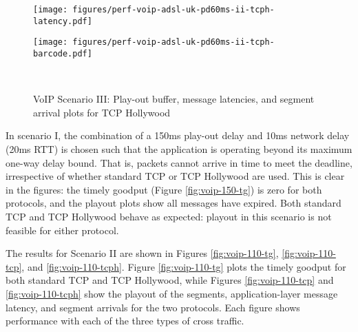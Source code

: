 \begin{figure*}[t!]
{{\begin{minipage}{61mm}
\texttt{[image: figures/perf-voip-adsl-uk-pd60ms-ii-tcph-latency.pdf]}\vspace{1mm}
\end{minipage}
\begin{minipage}{61mm}
\texttt{[image: figures/perf-voip-adsl-uk-pd60ms-ii-tcph-barcode.pdf]}\vspace{1mm}
\end{minipage}
\begin{minipage}{61mm}~\end{minipage}
}}
\caption{VoIP Scenario III: Play-out buffer, message latencies, and segment arrival plots for TCP Hollywood}
\label{fig:voip-60-tcph}
\end{figure*}

In scenario I, the combination of a 150ms play-out delay and 10ms network
delay (20ms RTT) is chosen such that the application is operating beyond
its maximum one-way delay bound. That is, packets cannot arrive in time to
meet the deadline, irrespective of whether standard TCP or TCP Hollywood
are used. This is clear in the figures: the timely goodput (Figure
\ref{fig:voip-150-tg}) is zero for both protocols, and the playout plots
show all messages have expired.  Both standard TCP and TCP Hollywood behave
as expected: playout in this scenario is not feasible for either protocol.

The results for Scenario II are shown in Figures \ref{fig:voip-110-tg},
\ref{fig:voip-110-tcp}, and \ref{fig:voip-110-tcph}.
Figure \ref{fig:voip-110-tg} plots the timely goodput for both standard TCP
and TCP Hollywood, while Figures \ref{fig:voip-110-tcp} and \ref{fig:voip-110-tcph} 
show the playout of the segments, application-layer message latency, and
segment arrivals for the two protocols. Each figure shows performance with
each of the three types of cross traffic. 

